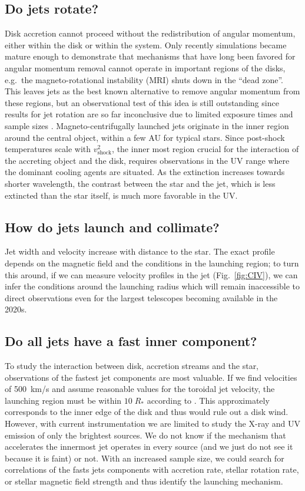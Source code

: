 \documentclass[12pt]{article}
\begin{document}
\subsection{Do jets rotate?}
Disk accretion cannot proceed without the redistribution of angular momentum, either within the disk or within the system. Only recently simulations became mature enough to demonstrate that mechanisms that have long been favored for angular momentum removal cannot operate in important regions of the disks, e.g.\ the magneto-rotational instability (MRI) shuts down in the ``dead zone''. This  leaves jets as the best known alternative to remove angular momentum from these regions, but an observational test of this idea is still outstanding since results for jet rotation are so far inconclusive due to limited exposure times and sample sizes \citep{2007ApJ...663..350C}. Magneto-centrifugally launched jets originate in the inner region around the central object, within a few AU for typical stars. Since post-shock temperatures scale with $v^2_\mathrm{shock}$, the inner most region crucial for the interaction of the accreting object and the disk, requires observations in the UV range where the dominant cooling agents are situated.
As the extinction increases towards shorter wavelength, the contrast between the star and the jet, which is less extincted than the star itself, is much
more favorable in the UV.


\subsection{How do jets launch and collimate?}
Jet width and velocity increase with distance to the star. The exact profile depends on the magnetic field and the conditions in the launching region; to turn this around, if we can measure velocity profiles in the jet (Fig.~\ref{fig:CIV}), we can infer the conditions around the launching radius which will remain inaccessible to direct observations even for the largest telescopes becoming available in the 2020s.


\subsection{Do all jets have a fast inner component?}
To study the interaction between disk, accretion streams and the star, observations of the fastest jet components are most valuable. If we find velocities of 500~km/s and assume
reasonable values for the toroidal jet velocity, the launching region must be
within $10\;R_*$ according to \citet{2003ApJ...590L.107A}. This approximately
corresponds to the inner edge of the disk and thus would rule out a disk
wind. However, with current instrumentation we are limited to study the X-ray
and UV emission of only the brightest sources. We do not know if the mechanism
that accelerates the innermost jet operates in every source (and we just do not
see it because it is faint) or not. With an increased sample size, we could search for correlations of the fasts jets components with accretion rate, stellar rotation rate, or stellar magnetic field strength and thus identify the launching mechanism.
\end{document}
